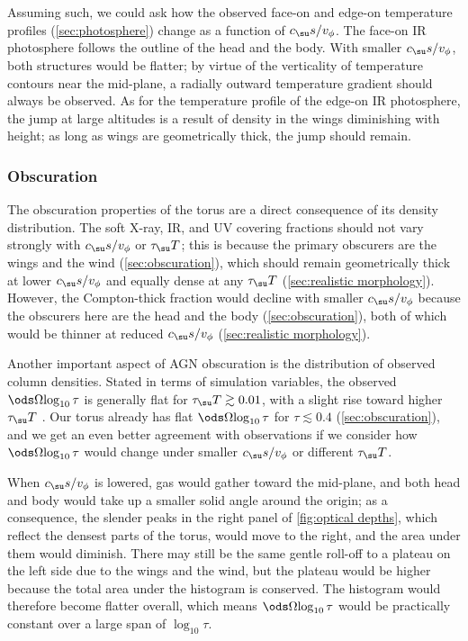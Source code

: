 \documentclass[twocolumn]{article}
\newcommand*\xray{\texorpdfstring{X\protect\nobreakdash-ray}{X-ray}}
\begin{document}
Assuming such, we could ask how the observed face-on and edge-on temperature
profiles (\cref{sec:photosphere}) change as a function of $c_\su s/v_\phi$. The
face-on \ac{IR} photosphere follows the outline of the head and the body. With
smaller $c_\su s/v_\phi$, both structures would be flatter; by virtue of the
verticality of temperature contours near the mid-plane, a radially outward
temperature gradient should always be observed. As for the temperature profile
of the edge-on \ac{IR} photosphere, the jump at large altitudes is a result of
density in the wings diminishing with height; as long as wings are
geometrically thick, the jump should remain.

\subsubsection{Obscuration}
\label{sec:realistic obscuration}

The obscuration properties of the torus are a direct consequence of its density
distribution. The soft \xray, \ac{IR}, and \ac{UV} covering fractions should
not vary strongly with $c_\su s/v_\phi$ or $\tau_\su T$; this is because the
primary obscurers are the wings and the wind (\cref{sec:obscuration}), which
should remain geometrically thick at lower $c_\su s/v_\phi$ and equally dense
at any $\tau_\su T$ (\cref{sec:realistic morphology}). However, the
Compton-thick fraction would decline with smaller $c_\su s/v_\phi$ because the
obscurers here are the head and the body (\cref{sec:obscuration}), both of
which would be thinner at reduced $c_\su s/v_\phi$ (\cref{sec:realistic
morphology}).

Another important aspect of \ac{AGN} obscuration is the distribution of
observed column densities. Stated in terms of simulation variables, the
observed $\ods\Omega{\log_{10}\tau}$ is generally flat for $\tau_\su
T\gtrsim0.01$, with a slight rise toward higher $\tau_\su T$ \citep[e.g.,][and
references therein]{2007A&A...463...79G}. Our torus already has flat
$\ods\Omega{\log_{10}\tau}$ for $\tau\lesssim0.4$ (\cref{sec:obscuration}), and
we get an even better agreement with observations if we consider how
$\ods\Omega{\log_{10}\tau}$ would change under smaller $c_\su s/v_\phi$ or
different $\tau_\su T$.

When $c_\su s/v_\phi$ is lowered, gas would gather toward the mid-plane, and
both head and body would take up a smaller solid angle around the origin; as a
consequence, the slender peaks in the right panel of \cref{fig:optical depths},
which reflect the densest parts of the torus, would move to the right, and the
area under them would diminish. There may still be the same gentle roll-off to
a plateau on the left side due to the wings and the wind, but the plateau would
be higher because the total area under the histogram is conserved. The
histogram would therefore become flatter overall, which means
$\ods\Omega{\log_{10}\tau}$ would be practically constant over a large span of
$\log_{10}\tau$.
\end{document}
